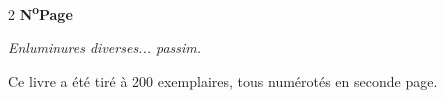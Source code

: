 \begin{multicols}{2}
\fontsize{7}{7.5}\selectfont
\setlength{\columnsep}{1em}
\noindent\textbf{N\textsuperscript{o}\hfill Page}

\begin{description}
\setlength{\itemsep}{-0.5ex}
\setlength{\parsep}{0pt}
\setlength{\topsep}{0pt}
\setlength{\partopsep}{0pt}
\renewcommand{\ourouxillustrationmetadata}[3]{%
    \item[#1] #2 \dotfill #3}

\end{description}
\end{multicols}

\begin{center}
\footnotesize
\textit{Enluminures diverses... passim.}

Ce livre a été tiré à 200 exemplaires, tous numérotés en seconde page.
\end{center}
